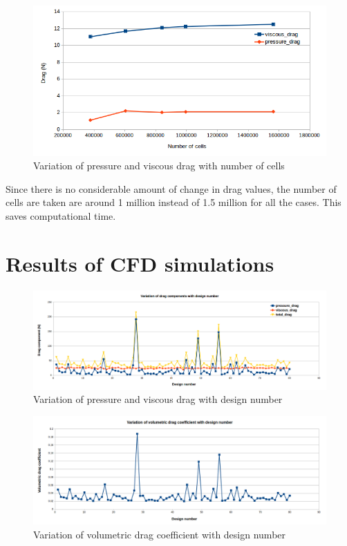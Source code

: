 \begin{figure}[H]
	\centering
	\includegraphics[width=300 pt]{surrogate_model_CFD_results/Grid_convergence.png}
	\caption{Variation of pressure and viscous drag with number of cells}
	\label{Grid convergence plot} %
\end{figure}
Since there is no considerable amount of change in drag values, the number of cells are taken are around 1 million instead of 1.5 million for all the cases. This saves computational time.

\section{Results of CFD simulations}
\begin{figure}[H]
	\centering
	\includegraphics[width=450 pt]{surrogate_model_CFD_results/Drag_components.png}
	\caption{Variation of pressure and viscous drag with design number}
	\label{Drag components plot} %
\end{figure}

\begin{figure}[H]
	\centering
	\includegraphics[width=450 pt]{surrogate_model_CFD_results/Volumetric_drag_coeff.png}
	\caption{Variation of volumetric drag coefficient with design number}
	\label{Volumetric drag coefficient plot} %
\end{figure}

